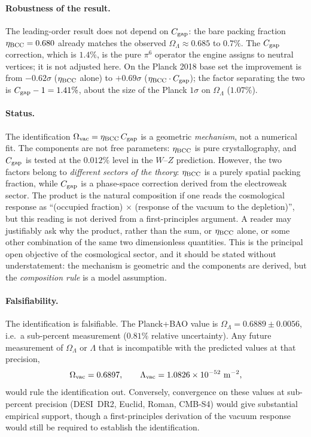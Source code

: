 \documentclass[10pt,a4paper]{article}
\begin{document}
\paragraph{Robustness of the result.} The leading-order result does
not depend on $C_{\rm gap}$: the bare packing fraction
$\eta_{\rm BCC} = 0.680$ already matches the observed
$\Omega_\Lambda \approx 0.685$ to $0.7\%$. The $C_{\rm gap}$
correction, which is $1.4\%$, is the pure $\pi^6$ operator the
engine assigns to neutral vertices; it is not adjusted here. On the
Planck 2018 base set the improvement is from $-0.62\sigma$
($\eta_{\rm BCC}$ alone) to $+0.69\sigma$ ($\eta_{\rm BCC}\cdot
C_{\rm gap}$); the factor separating the two is $C_{\rm gap}-1 =
1.41\%$, about the size of the Planck $1\sigma$ on $\Omega_\Lambda$
($1.07\%$).

\paragraph{Status.} The identification
\(\Omega_{\rm vac} = \eta_{\rm BCC}\,C_{\rm gap}\) is a geometric
\emph{mechanism}, not a numerical fit. The components are not free
parameters: \(\eta_{\rm BCC}\) is pure crystallography, and
\(C_{\rm gap}\) is tested at the \(0.012\%\) level in the \(W\)--\(Z\)
prediction. However, the two factors belong to \emph{different
	sectors of the theory}: \(\eta_{\rm BCC}\) is a purely spatial
packing fraction, while \(C_{\rm gap}\) is a phase-space correction
derived from the electroweak sector. The product is the natural
composition if one reads the cosmological response as
``(occupied fraction) \(\times\) (response of the vacuum to the
depletion)'', but this reading is not derived from a first-principles
argument. A reader may justifiably ask why the product, rather than
the sum, or \(\eta_{\rm BCC}\) alone, or some other combination of
the same two dimensionless quantities. This is the principal open
objective of the cosmological sector, and it should be stated without
understatement: the mechanism is geometric and the components are
derived, but the \emph{composition rule} is a model assumption.

\paragraph{Falsifiability.} The identification is falsifiable. The
Planck+BAO value is $\Omega_\Lambda = 0.6889 \pm 0.0056$, i.e.\ a
sub-percent measurement ($0.81\%$ relative uncertainty). Any future
measurement of $\Omega_\Lambda$ or $\Lambda$ that is incompatible
with the predicted values at that precision,
\begin{equation}
	\Omega_{\rm vac} = 0.6897, \qquad
	\Lambda_{\rm vac} = 1.0826\times 10^{-52}\ {\rm m^{-2}},
	\label{eq:summary_prediction_values}
\end{equation}
would rule the identification out. Conversely, convergence on these
values at sub-percent precision (DESI~DR2, Euclid, Roman, CMB-S4)
would give substantial empirical support, though a first-principles
derivation of the vacuum response would still be required to
establish the identification.
\end{document}

